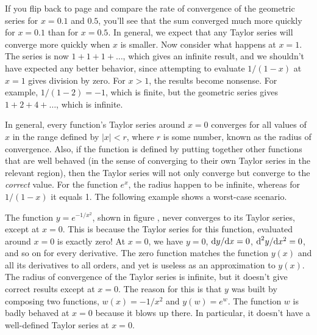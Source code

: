 If you flip back to page \pageref{geometric-tenths} and compare the rate of convergence of the geometric
series for $x=0.1$ and $0.5$, you'll see that the sum converged 
much more quickly for $x=0.1$ than for $x=0.5$. In general, we expect
that any Taylor series will converge more quickly when $x$ is smaller. Now consider what happens at $x=1$. The series
is now $1+1+1+\ldots$, which gives an infinite result, and we shouldn't have expected any better behavior, since
attempting to evaluate $1/(1-x)$ at $x=1$ gives division by zero. For $x>1$, the results become nonsense.
For example, $1/(1-2)=-1$, which is finite, but the geometric series gives $1+2+4+\ldots$, which is infinite.

In general, every function's Taylor series around $x=0$ converges for all values of $x$ in the range
defined by $|x|<r$, where $r$ is some number, known as the radius of convergence.
Also, if the function is defined by putting together other functions that are well behaved (in the sense of
converging to their own Taylor series in the relevant region), then the Taylor series will not only converge
but converge to the \emph{correct} value.
For the function $e^x$, the radius
happen to be infinite, whereas for $1/(1-x)$ it equals 1. The following example shows a worst-case
scenario.


\begin{eg}
The function $y=e^{-1/x^2}$, shown in figure , never converges to its Taylor series, except at $x=0$.
This is because the Taylor series for this function, evaluated around $x=0$ is exactly zero! At $x=0$, we have
$y=0$, $\textup{d} y/\textup{d} x=0$, $\textup{d}^2 y/\textup{d} x^2=0$, and so on for every derivative. The zero function matches the function
$y(x)$ and all its derivatives to all orders, and yet is useless as an approximation to $y(x)$. The radius of convergence
of the Taylor series is infinite, but it doesn't give correct results except at $x=0$. The reason for this is that
$y$ was built by composing two functions, $w(x)=-1/x^2$ and $y(w)=e^w$. The function $w$ is badly behaved at $x=0$
because it blows up there. In particular, it doesn't have a well-defined Taylor series at $x=0$.
\end{eg}

